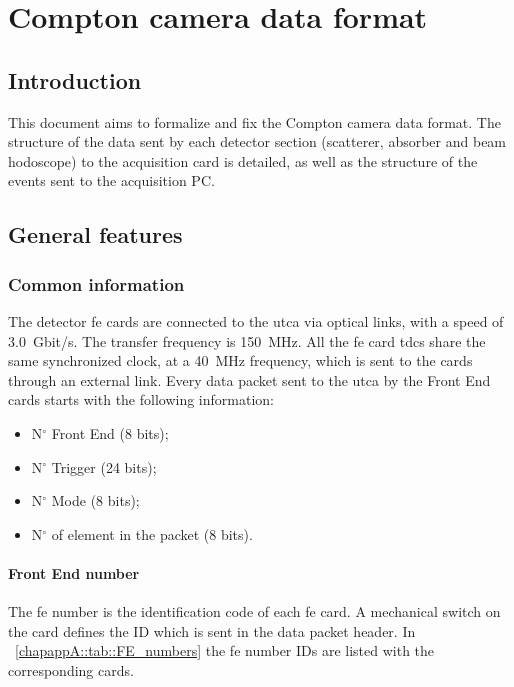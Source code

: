\chapter{Compton camera data format}\label{chap::appA}

\glsresetall



\section{Introduction}\label{chapappA::sec::Intro}
This document aims to formalize and fix the Compton camera data format. The structure of the data sent by each detector section (scatterer, absorber and beam hodoscope) to the acquisition card is detailed, as well as the structure of the events sent to the acquisition PC.


\section{General features}\label{chapappA::sec::GenFeat}
\subsection{Common information}\label{chapappA::subsec::cmnInfo}
The detector \gls{fe} cards are connected to the \gls{utca} via optical links, with a speed of 3.0~Gbit/s. The transfer frequency is 150~MHz.\newline
All the \gls{fe} card \glspl{tdc} share the same synchronized clock, at a 40~MHz frequency, which is sent to the cards through an external link.\newline
Every data packet sent to the \gls{utca} by the Front End cards starts with the following information:
\begin{itemize}
	\item N$^{\circ}$ Front End (8 bits);
	\item N$^{\circ}$ Trigger (24 bits);
	\item N$^{\circ}$ Mode (8 bits);
	\item N$^{\circ}$ of element in the packet (8 bits).
\end{itemize}

\subsubsection{Front End number}\label{chapappA::subsubsec::FEnum}
The \gls{fe} number is the identification code of each \gls{fe} card. A mechanical switch on the card defines the ID which is sent in the data packet header.
\newline
In \tablename~\ref{chapappA::tab::FE_numbers} the \gls{fe} number IDs are listed with the corresponding cards.

